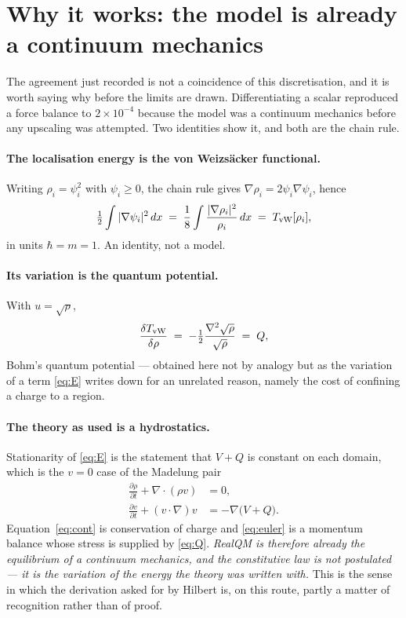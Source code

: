 \documentclass[11pt]{article}
\newcommand{\half}{\tfrac12}
\newcommand{\grad}{\nabla}
\begin{document}
\section{Why it works: the model is already a continuum mechanics}\label{sec:balance}

The agreement just recorded is not a coincidence of this discretisation, and it is worth saying
why before the limits are drawn. Differentiating a scalar reproduced a force balance to
$2\times10^{-4}$ because the model was a continuum mechanics before any upscaling was attempted.
Two identities show it, and both are the chain rule.

\paragraph{The localisation energy is the von Weizs\"acker functional.} Writing
$\rho_i=\psi_i^2$ with $\psi_i\ge0$, the chain rule gives $\grad\rho_i = 2\psi_i\grad\psi_i$, hence
\begin{equation}\label{eq:vW}
\half\int|\grad\psi_i|^2\,dx \;=\; \frac18\int\frac{|\grad\rho_i|^2}{\rho_i}\,dx
\;=\; T_{\rm vW}[\rho_i] ,
\end{equation}
in units $\hbar=m=1$. An identity, not a model.

\paragraph{Its variation is the quantum potential.} With $u=\sqrt{\rho}$,
\begin{equation}\label{eq:Q}
\frac{\delta T_{\rm vW}}{\delta\rho} \;=\; -\half\frac{\grad^2\sqrt{\rho}}{\sqrt{\rho}} \;=\; Q ,
\end{equation}
Bohm's quantum potential --- obtained here not by analogy but as the variation of a term
\eqref{eq:E} writes down for an unrelated reason, namely the cost of confining a charge to a region.

\paragraph{The theory as used is a hydrostatics.} Stationarity of \eqref{eq:E} is the statement that
$V+Q$ is constant on each domain, which is the $v=0$ case of the Madelung pair
\begin{align}
\frac{\partial\rho}{\partial t}+\grad\!\cdot(\rho v)&=0 ,\label{eq:cont}\\
\frac{\partial v}{\partial t}+(v\cdot\grad)v&=-\grad\bigl(V+Q\bigr) .\label{eq:euler}
\end{align}
Equation~\eqref{eq:cont} is conservation of charge and \eqref{eq:euler} is a momentum balance whose
stress is supplied by \eqref{eq:Q}. \emph{RealQM is therefore already the equilibrium of a continuum
mechanics, and the constitutive law is not postulated --- it is the variation of the energy the
theory was written with.} This is the sense in which the derivation asked for by Hilbert is, on this
route, partly a matter of recognition rather than of proof.
\end{document}
